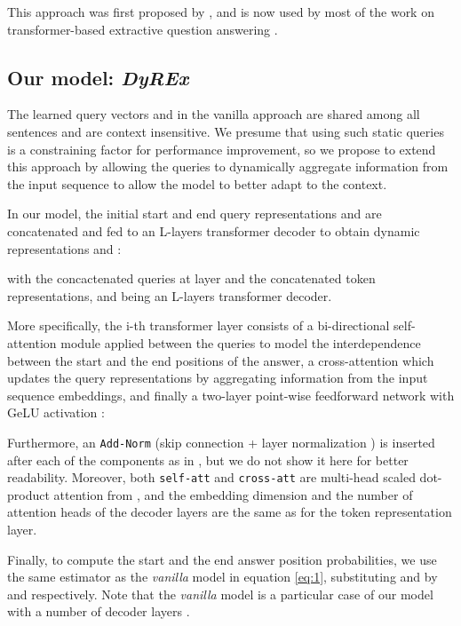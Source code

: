 \documentclass{article}
\begin{document}
This approach was first proposed by \citet{BERT}, and is now used by most of the work on transformer-based extractive question answering \citep{RoBERTa, span_BERT,shi2022revisiting}. 


\subsection{Our model: \textit{DyREx}}

The learned query vectors  and  in the vanilla approach are shared among all sentences and are context insensitive. We presume that using such static queries is a constraining factor for performance improvement, so we propose to extend this approach by allowing the queries to dynamically aggregate information from the input sequence to allow the model to better adapt to the context.

In our model, the initial start and end query representations  and  are concatenated and fed to an L-layers transformer decoder \citep{attention_is_all_u_need} to obtain dynamic representations  and : 



with  the concactenated queries at layer  and  the concatenated token representations, and  being an L-layers transformer decoder. 

More specifically, the i-th transformer layer consists of a bi-directional self-attention module  applied between the queries to model the interdependence between the start and the end positions of the answer, a cross-attention  which updates the query representations by aggregating information from the input sequence embeddings, and finally a two-layer point-wise feedforward network  with GeLU activation \citep{GeLU_act}:


Furthermore, an \texttt{Add-Norm} (skip connection \citep{Resnet} + layer normalization \citep{layernorm}) is inserted after each of the components as in \citet{attention_is_all_u_need}, but we do not show it here for better readability. Moreover, both \texttt{self-att} and \texttt{cross-att} are multi-head scaled dot-product attention from \citet{attention_is_all_u_need}, and the embedding dimension and the number of attention heads of the decoder layers are the same as for the token representation layer.


Finally, to compute the start and the end answer position probabilities, we use the same estimator as the \textit{vanilla} model in equation \ref{eq:1}, substituting  and  by  and  respectively. Note that the \textit{vanilla} model is a particular case of our model with a number of decoder layers .
\end{document}
